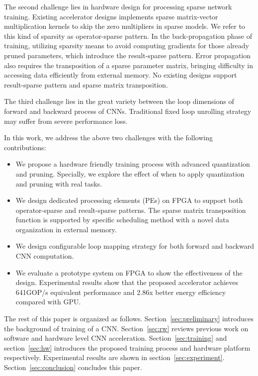 The second challenge lies in hardware design for processing sparse network training. Existing accelerator designs implements sparse matrix-vector multiplication kernels to skip the zero multipliers in sparse models. We refer to this kind of sparsity as operator-sparse pattern. In the back-propagation phase of training, utilizing sparsity means to avoid computing gradients for those already pruned parameters, which introduce the result-sparse pattern. Error propagation also requires the transposition of a sparse parameter matrix, bringing difficulty in accessing data efficiently from external memory. No existing designs support result-sparse pattern and sparse matrix transposition.

The third challenge lies in the great variety between the loop dimensions of forward and backward process of CNNs. Traditional fixed loop unrolling strategy may suffer from severe performance loss. 

In this work, we address the above two challenges with the following contributions:

\begin{itemize}
  \item We propose a hardware friendly training process with advanced quantization and pruning. Specially, we explore the effect of when to apply quantization and pruning with real tasks.
  \item We design dedicated processing elements (PEs) on FPGA to support both operator-sparse and result-sparse patterns. The sparse matrix transposition function is supported by specific scheduling method with a novel data organization in external memory.
  \item We design configurable loop mapping strategy for both forward and backward CNN computation. 
  \item We evaluate a prototype system on FPGA to show the effectiveness of the design. Experimental results show that the proposed accelerator achieves 641GOP/s equivalent performance and 2.86x better energy efficiency compared with GPU.
\end{itemize}

The rest of this paper is organized as follows. Section~\ref{sec:preliminary} introduces the background of training of a CNN. Section~\ref{sec:rw} reviews previous work on software and hardware level CNN acceleration. Section~\ref{sec:training} and section~\ref{sec:hw} introduces the proposed training process and hardware platform respectively. Experimental results are shown in section~\ref{sec:experiment}. Section~\ref{sec:conclusion} concludes this paper.
